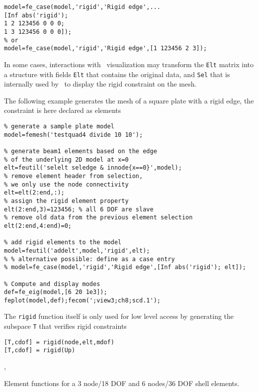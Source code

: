 \begin{verbatim}
model=fe_case(model,'rigid','Rigid edge',...
[Inf abs('rigid'); 
1 2 123456 0 0 0;
1 3 123456 0 0 0]);
% or
model=fe_case(model,'rigid','Rigid edge',[1 123456 2 3]);
\end{verbatim}

\vs In some cases, interactions with \feplot\ visualization may transform the {\tt Elt} matrix into a structure with fields {\tt Elt} that contains the original data, and {\tt Sel} that is internally used by \feplot\ to display the rigid constraint on the mesh.

\vs The following example generates the mesh of a square plate with a rigid edge, the  constraint is here declared as  elements  

\begin{verbatim}
% generate a sample plate model
model=femesh('testquad4 divide 10 10');

% generate beam1 elements based on the edge 
% of the underlying 2D model at x=0
elt=feutil('selelt seledge & innode{x==0}',model);
% remove element header from selection, 
% we only use the node connectivity
elt=elt(2:end,:);
% assign the rigid element property 
elt(2:end,3)=123456; % all 6 DOF are slave
% remove old data from the previous element selection
elt(2:end,4:end)=0; 

% add rigid elements to the model
model=feutil('addelt',model,'rigid',elt);
% % alternative possible: define as a case entry
% model=fe_case(model,'rigid','Rigid edge',[Inf abs('rigid'); elt]); 

% Compute and display modes
def=fe_eig(model,[6 20 1e3]);
feplot(model,def);fecom(';view3;ch8;scd.1');
\end{verbatim}%

\vs 
The {\tt rigid} function itself is only used for low level access by generating the subspace {\tt T} that verifies rigid constraints 

\begin{verbatim}
[T,cdof] = rigid(node,elt,mdof)
[T,cdof] = rigid(Up)
\end{verbatim}


, \celas


Element functions for a 3 node/18 DOF and 6 nodes/36 DOF shell elements.


